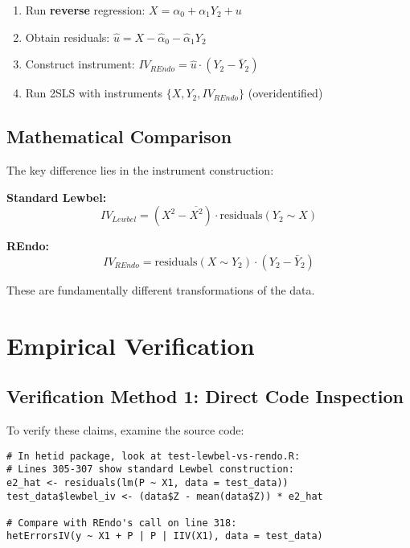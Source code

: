 \documentclass[12pt]{article}
\begin{document}
\begin{enumerate}
\item Run \textbf{reverse} regression: $X = \alpha_0 + \alpha_1 Y_2 + u$
\item Obtain residuals: $\hat{u} = X - \hat{\alpha}_0 - \hat{\alpha}_1 Y_2$
\item Construct instrument: $IV_{REndo} = \hat{u} \cdot (Y_2 - \bar{Y}_2)$
\item Run 2SLS with instruments $\{X, Y_2, IV_{REndo}\}$ (overidentified)
\end{enumerate}

\subsection{Mathematical Comparison}

The key difference lies in the instrument construction:

\textbf{Standard Lewbel:}
\begin{equation}
IV_{Lewbel} = (X^2 - \overline{X^2}) \cdot \text{residuals}(Y_2 \sim X)
\end{equation}

\textbf{REndo:}
\begin{equation}
IV_{REndo} = \text{residuals}(X \sim Y_2) \cdot (Y_2 - \bar{Y}_2)
\end{equation}

These are fundamentally different transformations of the data.

\section{Empirical Verification}

\subsection{Verification Method 1: Direct Code Inspection}

To verify these claims, examine the source code:

\begin{lstlisting}[caption={Verifying hetid's implementation}]
# In hetid package, look at test-lewbel-vs-rendo.R:
# Lines 305-307 show standard Lewbel construction:
e2_hat <- residuals(lm(P ~ X1, data = test_data))
test_data$lewbel_iv <- (data$Z - mean(data$Z)) * e2_hat

# Compare with REndo's call on line 318:
hetErrorsIV(y ~ X1 + P | P | IIV(X1), data = test_data)
\end{lstlisting}
\end{document}
